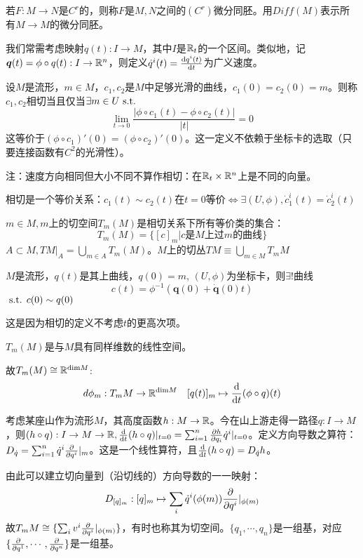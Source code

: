 \documentclass{ctexbook}
\begin{document}
若$F:M\to N$是$C^{r}$的，则称$F$是$M,N$之间的$(C^{r})$微分同胚。用$Diff(M)$表示所有$M\to M$的微分同胚。

我们常需考虑映射$q(t):I\to M$，其中$I$是$\mathbb{R}_{t}$的一个区间。类似地，记$\bm q(t)=\phi\circ q(t):I\to\mathbb{R}^{n}$，则定义$\dot{ q}^{i}(t)=\frac{\mathrm{d}q^{i}(t)}{\mathrm{d}t}$为广义速度。

\begin{Def}[相切]
  设$M$是流形，$m\in M$，$c_{1},c_{2}$是$M$中足够光滑的曲线，$c_{1}(0)=c_{2}(0)=m$。则称$c_{1},c_{2}$相切当且仅当$\exists m\in U\text{ s.t. } $\[\lim\limits_{t\to 0}\frac{|\phi\circ c_{1}(t)- \phi\circ c_{2}(t)|}{|t|}=0\]
  这等价于$(\phi\circ c_{1})'(0)=(\phi\circ c_{2})'(0)$。这一定义不依赖于坐标卡的选取（只要连接函数有$C^{2}$的光滑性）。
\end{Def}

注：速度方向相同但大小不同不算作相切：在$\mathbb{R}_{t}\times\mathbb{R}^{n}$上是不同的向量。

相切是一个等价关系：$c_{1}(t)\sim c_{2}(t)$在$t=0$等价$\Leftrightarrow \exists (U,\phi), \dot c_{1}^{i}(t)=\dot c_{2}^{i}(t)$

\begin{Def}[切空间]
  $m\in M,m$上的切空间$T_{m}(M)$是相切关系下所有等价类的集合：
  \[T_{m}(M)=\{[c]_{m}|c\text{是}M\text{上过}m\text{的曲线}\}\]
  $A\subset M, TM|_{A}=\bigcup\limits_{m\in A}T_{m}(M)$。$M$上的切丛$TM\equiv \bigcup_{m\in M}T_{m}M$
\end{Def}

\begin{Prop}
  $M$是流形，$q(t)$是其上曲线，$q(0)=m$, $(U,\phi)$为坐标卡，则$\exists !$曲线
  \[c(t)=\phi^{-1}(\bm q(0)+\dot{\bm q}(0)t)\]
  $\text{ s.t. } c(0)\sim q(0)$
\end{Prop}

这是因为相切的定义不考虑$t$的更高次项。

\begin{Cor}
  $T_{m}(M)$是与$M$具有同样维数的线性空间。
\end{Cor}
故$T_{m}(M)\cong \mathbb{R}^{\mathrm{dim}M}$: \[d{\phi_{m}}:T_{m}M\to \mathbb{R}^{\mathrm{dim}M}\quad[q(t)]_{m}\mapsto \frac{\mathrm{d}}{\mathrm{d}t}(\phi\circ q)(t)\]

考虑某座山作为流形$M$，其高度函数$h:M\to \mathbb{R}$。今在山上游走得一路径$q:I\to M$，则$(h\circ q): I\to M\to\mathbb{R}, \frac{\mathrm{d}}{\mathrm{d}t}(h\circ q)|_{t=0}=\sum_{i=1}^{n}\frac{\partial h}{\partial q_{i}}\dot{q}^{i}|_{t=0}$。定义方向导数之算符：$D_{\dot{q}}=\sum_{i=1}^{n}\dot{q}^{i}\frac{\partial }{\partial q^{i}}|_{m}$。这是一个线性算符，且$\frac{\mathrm{d}}{\mathrm{d}t}(h\circ q)=D_{\dot{q}}h$。

由此可以建立切向量到（沿切线的）方向导数的一一映射：
\[D_{[q]_{m}}: [q]_{m}\mapsto \sum_{i}\dot{q}^{i}(\phi(m))\frac{\partial }{\partial q^{i}}|_{\phi(m)}\]
故$T_{m}M\cong \{\sum_{i}v^{i}\frac{\partial }{\partial q^{i}}|_{\phi(m)}\}$，有时也称其为切空间。$\{q_{1},\cdots,q_{n}\}$是一组基，对应$\{\frac{\partial }{\partial q^{1}},\cdots,\frac{\partial }{\partial q^{n}}\}$是一组基。
\end{document}

